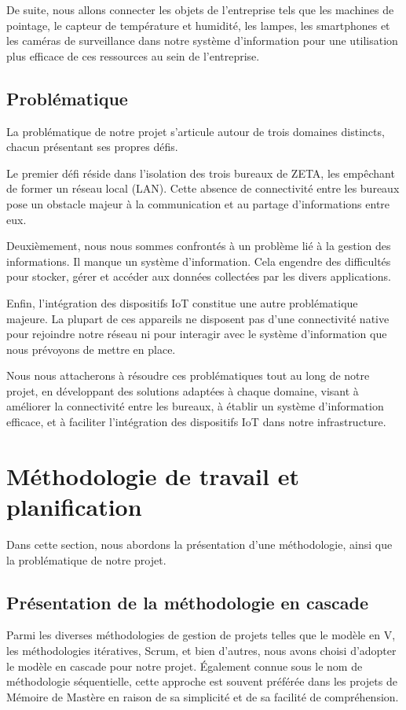 De suite, nous allons connecter les objets de l'entreprise tels que les machines de pointage, le capteur de température et humidité, les lampes, les smartphones et les caméras de surveillance dans notre système d'information pour une utilisation plus efficace de ces ressources au sein de l'entreprise.

\subsection{Problématique}
La problématique de notre projet s'articule autour de trois domaines distincts, chacun présentant ses propres défis.

Le premier défi réside dans l'isolation des trois bureaux de ZETA, les empêchant de former un réseau local (LAN). Cette absence de connectivité entre les bureaux pose un obstacle majeur à la communication et au partage d'informations entre eux.

Deuxièmement, nous nous sommes confrontés à un problème lié à la gestion des informations. Il manque un système d'information. Cela engendre des difficultés pour stocker, gérer et accéder aux données collectées par les divers applications.

Enfin, l'intégration des dispositifs IoT constitue une autre problématique majeure. La plupart de ces appareils ne disposent pas d'une connectivité native pour rejoindre notre réseau ni pour interagir avec le système d'information que nous prévoyons de mettre en place.

Nous nous attacherons à résoudre ces problématiques tout au long de notre projet, en développant des solutions adaptées à chaque domaine, visant à améliorer la connectivité entre les bureaux, à établir un système d'information efficace, et à faciliter l'intégration des dispositifs IoT dans notre infrastructure.

\section{Méthodologie de travail et planification}

Dans cette section, nous abordons la présentation d'une méthodologie, ainsi que la problématique de notre projet.


\subsection{Présentation de la méthodologie en cascade}

Parmi les diverses méthodologies de gestion de projets telles que le modèle en V, les méthodologies itératives, Scrum, et bien d'autres, nous avons choisi d'adopter le modèle en cascade pour notre projet. Également connue sous le nom de méthodologie séquentielle, cette approche est souvent préférée dans les projets de Mémoire de Mastère en raison de sa simplicité et de sa facilité de compréhension.

